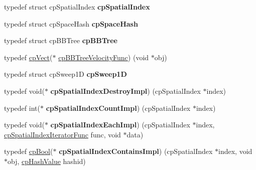 \begin{DoxyCompactItemize}
\item 
\mbox{\label{group__cp_spatial_index_ga1af77c242def41e791d49350c809cc7f}} 
typedef struct cp\+Spatial\+Index {\bfseries cp\+Spatial\+Index}
\item 
\mbox{\label{group__cp_spatial_index_ga3ff6ff3229f67d50c8a936fce831e047}} 
typedef struct cp\+Space\+Hash {\bfseries cp\+Space\+Hash}
\item 
\mbox{\label{group__cp_spatial_index_ga8347b442aab8cc34989d11220846260a}} 
typedef struct cp\+B\+B\+Tree {\bfseries cp\+B\+B\+Tree}
\item 
typedef \mbox{\hyperlink{structcp_vect}{cp\+Vect}}($\ast$ \mbox{\hyperlink{group__cp_spatial_index_ga5e805ddbe3cab9b92a6fbd933ff6e6b0}{cp\+B\+B\+Tree\+Velocity\+Func}}) (void $\ast$obj)
\item 
\mbox{\label{group__cp_spatial_index_gad24eda1cd6772ea93a036c766b787c3b}} 
typedef struct cp\+Sweep1D {\bfseries cp\+Sweep1D}
\item 
\mbox{\label{group__cp_spatial_index_gaaaf3c06d9176031f22ccd1f69a760ebb}} 
typedef void($\ast$ {\bfseries cp\+Spatial\+Index\+Destroy\+Impl}) (cp\+Spatial\+Index $\ast$index)
\item 
\mbox{\label{group__cp_spatial_index_gae98eded3b672a84bdae64ff61476d096}} 
typedef int($\ast$ {\bfseries cp\+Spatial\+Index\+Count\+Impl}) (cp\+Spatial\+Index $\ast$index)
\item 
\mbox{\label{group__cp_spatial_index_ga7c2c2ed1234f45f8b3e50cb79d23f882}} 
typedef void($\ast$ {\bfseries cp\+Spatial\+Index\+Each\+Impl}) (cp\+Spatial\+Index $\ast$index, \mbox{\hyperlink{group__cp_spatial_index_ga522e250b59a1802d3648085685d41f97}{cp\+Spatial\+Index\+Iterator\+Func}} func, void $\ast$data)
\item 
\mbox{\label{group__cp_spatial_index_gad729c7d8dd9cd247b35727fc2aa2bc84}} 
typedef \mbox{\hyperlink{group__basic_types_gabc5e752c48f3449ca26ef413ecbd647e}{cp\+Bool}}($\ast$ {\bfseries cp\+Spatial\+Index\+Contains\+Impl}) (cp\+Spatial\+Index $\ast$index, void $\ast$obj, \mbox{\hyperlink{group__basic_types_gae7eb4775a9f43914a15553ca65a048f4}{cp\+Hash\+Value}} hashid)

\end{DoxyCompactItemize}
